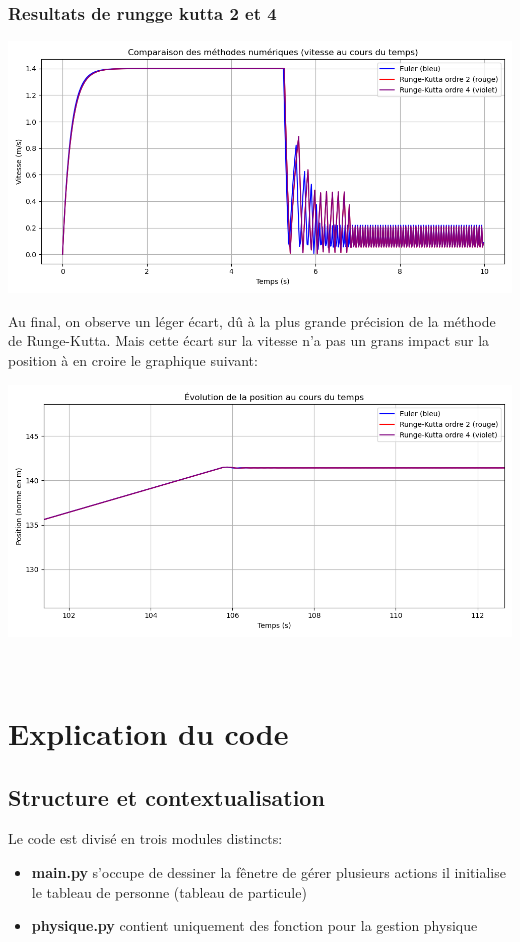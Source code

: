\documentclass[a4paper,12pt]{article}
\begin{document}
\subsubsection{Resultats de rungge kutta 2 et 4}

\includegraphics[width=\textwidth]{runge.png}

Au final, on observe un léger écart, dû à la plus grande précision de la méthode de Runge-Kutta. Mais cette écart sur la vitesse n'a pas un grans impact sur la position à en croire le graphique suivant:

\includegraphics[width=\textwidth]{runge_pos.png}


\
\section{Explication du code}
\subsection{Structure et contextualisation}
\noindent Le code est divisé en trois modules distincts:
\begin{itemize}
	\item \textbf{main.py} s'occupe de dessiner la fênetre de gérer plusieurs actions il initialise le tableau de personne (tableau de particule)
	
	\item \textbf{physique.py} contient uniquement des fonction pour la gestion physique
\end{itemize}
\end{document}
